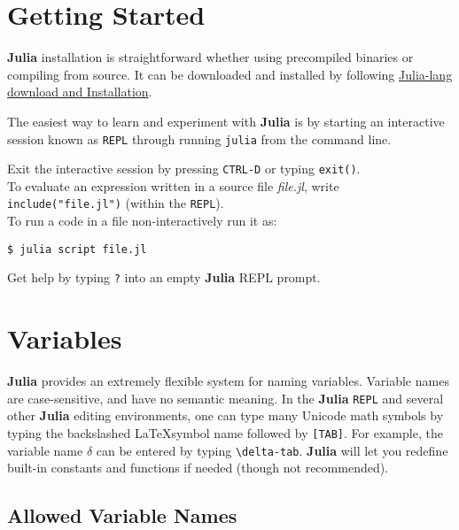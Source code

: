 \documentclass[
]{article}
\begin{document}
\newpage

\hypertarget{getting-started}{%
\section{Getting Started}\label{getting-started}}

\textbf{Julia} installation is straightforward whether using precompiled
binaries or compiling from source. It can be downloaded and installed by
following \href{https://julialang.org/downloads/}{Julia-lang download
and Installation}.

The easiest way to learn and experiment with \textbf{Julia} is by
starting an interactive session known as \texttt{REPL} through running
\texttt{julia} from the command line.

Exit the interactive session by pressing \texttt{CTRL-D} or typing
\texttt{exit()}.\\
To evaluate an expression written in a source file \emph{file.jl}, write
\texttt{include("file.jl")} (within the \texttt{REPL}).\\
To run a code in a file non-interactively run it as:

\begin{verbatim}
$ julia script file.jl
\end{verbatim}

Get help by typing \texttt{?} into an empty \textbf{Julia} REPL prompt.

\newpage

\hypertarget{variables}{%
\section{Variables}\label{variables}}

\textbf{Julia} provides an extremely flexible system for naming
variables. Variable names are case-sensitive, and have no semantic
meaning. In the \textbf{Julia} \texttt{REPL} and several other
\textbf{Julia} editing environments, one can type many Unicode math
symbols by typing the backslashed \LaTeX symbol name followed by
\texttt{{[}TAB{]}}. For example, the variable name \(\delta\) can be
entered by typing \texttt{\textbackslash{}delta-tab}. \textbf{Julia}
will let you redefine built-in constants and functions if needed (though
not recommended).

\hypertarget{allowed-variable-names}{%
\subsection{Allowed Variable Names}\label{allowed-variable-names}}
\end{document}
